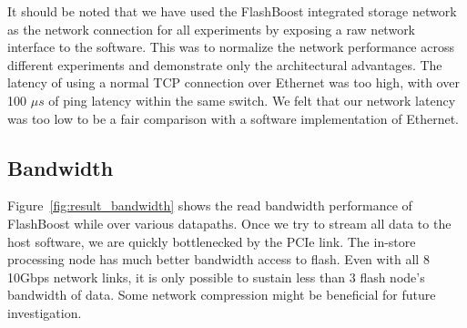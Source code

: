 It should be noted that we have used the FlashBoost integrated storage network
as the network connection for all experiments by exposing a raw network
interface to the software. This was to normalize the network performance across
different experiments and demonstrate only the architectural advantages. The
latency of using a normal TCP connection over Ethernet was too high, with over 100
$\mu s$ of ping latency within the same switch.  We felt that our network
latency was too low to be a fair comparison with a software implementation
of Ethernet.

%
%


\subsection{Bandwidth}

Figure~\ref{fig:result_bandwidth} shows the read bandwidth performance of
FlashBoost while over various datapaths. Once we try to stream all data to the
host software, we are quickly bottlenecked by the PCIe link. The in-store
processing node has much better bandwidth access to flash. Even with all 8
10Gbps network links, it is only possible to sustain less than 3 flash node's
bandwidth of data. Some network compression might be beneficial for future
investigation.


